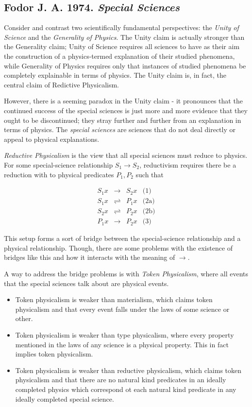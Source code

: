 \documentclass{article}
\newcommand{\tx}[1]{\text{#1}}
\newcommand{\ti}[1]{\textit{#1}}
\newcommand{\annbibtitle}[2]{\subsection*{#1. \ti{#2}}}
\begin{document}
\annbibtitle{Fodor J. A. 1974}{Special Sciences}

Consider and contrast two scientifically fundamental perspectives: the \ti{Unity of Science} and the \ti{Generality of Physics}. The Unity claim is actually stronger than the Generality claim; Unity of Science requires all sciences to have as their aim the construction of a physics-termed explanation of their studied phenomena, while Generality of Physics requires only that instances of studied phenomena be completely explainable in terms of physics. The Unity claim is, in fact, the central claim of Redictive Physicalism.

However, there is a seeming paradox in the Unity claim - it pronounces that the continued success of the special sciences is just more and more evidence that they ought to be discontinued; they stray further and further from an explanation in terms of physics. The \ti{special sciences} are sciences that do not deal directly or appeal to physical explanations.

\ti{Reductive Physicalism} is the view that all special sciences must reduce to physics. For some special-science relationship $S_1 \rightarrow S_2$, reductivism requires there be a reduction with to physical predicates $P_1, P_2$ such that

$$
\begin{array}{rcll}
    S_1 x & \rightarrow & S_2 x & \tx{(1)} \\
    S_1 x & \rightleftharpoons & P_1 x & \tx{(2a)} \\
    S_2 x & \rightleftharpoons & P_2 x & \tx{(2b)} \\
    P_1 x & \rightarrow & P_2 x & \tx{(3)}
\end{array}
$$

This setup forms a sort of bridge between the special-science relationship and a physical relationship. Though, there are some problems with the existence of bridges like this and how it interacts with the meaning of $\rightarrow$.

A way to address the bridge problems is with \ti{Token Physicalism}, where all events that the special sciences talk about are physical events.
\begin{itemize}
    \item Token physicalism is weaker than materialism, which claims token physicalism and that every event falls under the laws of some science or other.
    \item Token physicalism is weaker than type physicalism, where every property mentioned in the laws of any science is a physical property. This in fact implies token physicalism.
    \item Token physicalism is weaker than reductive physicalism, which claims token physicalism and that there are no natural kind predicates in an ideally completed physics which correspond ot each natural kind predicate in any ideally completed special science.
\end{itemize}
\end{document}
